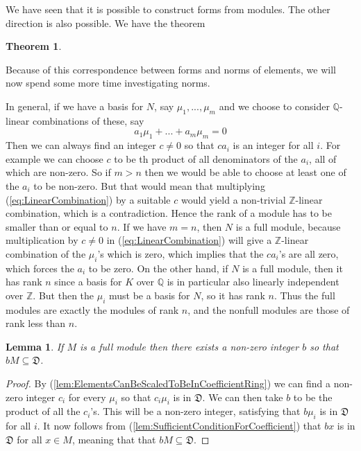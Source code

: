 \documentclass{article}
\newtheorem{theorem}{Theorem}[section]
\newtheorem{lemma}{Lemma}[section]
\newcommand{\mfrak}[1]{\mathfrak{#1}}
\newcommand{\mbb}[1]{\mathbb{#1}}
\begin{document}
We have seen that it is possible to construct forms from modules. The other direction is also possible. We have the theorem

\begin{theorem}
\end{theorem}

Because of this correspondence between forms and norms of elements, we will now spend some more time investigating norms. 

In general, if we have a basis for $N$, say $\mu_1, ..., \mu_m$ and we choose to consider $\mbb Q$-linear combinations of these, say 
\begin{equation} \label{eq:LinearCombination}
    a_1 \mu_1 + ... + a_m \mu_m = 0 
\end{equation}
Then we can always find an integer $c \neq 0$ so that $c a_i$ is an integer for all $i$. For example we can choose $c$ to be th product of all denominators of the $a_i$, all of which are non-zero. So if $m > n$ then we would be able to choose at least one of the $a_i$ to be non-zero. But that would mean that multiplying (\ref{eq:LinearCombination}) by a suitable $c$ would yield a non-trivial $\mbb Z$-linear combination, which is a contradiction. Hence the rank of a module has to be smaller than or equal to $n$. If we have $m = n$, then $N$ is a full module, because multiplication by $c \neq 0$ in (\ref{eq:LinearCombination}) will give a $\mbb Z$-linear combination of the $\mu_i$'s which is zero, which implies that the $ca_i$'s are all zero, which forces the $a_i$ to be zero. On the other hand, if $N$ is a full module, then it has rank $n$ since a basis for $K$ over $\mbb Q$ is in particular also linearly independent over $\mbb Z$. But then the $\mu_i$ must be a basis for $N$, so it has rank $n$. Thus the full modules are exactly the modules of rank $n$, and the nonfull modules are those of rank less than $n$.

\begin{lemma}\label{lem:ModuleCanBeScaledToFitInsideCoefficientRing}
    If $M$ is a full module then there exists a non-zero integer $b$ so that $bM \subseteq \mfrak D$.
    \end{lemma}
    \begin{proof}
    By (\ref{lem:ElementsCanBeScaledToBeInCoefficientRing}) we can find a non-zero integer $c_i$ for every $\mu_i$ so that $c_i \mu_i$ is in $\mfrak D$. We can then take $b$ to be the product of all the $c_i$'s. This will be a non-zero integer, satisfying that $b \mu_i$ is in $\mfrak D$ for all $i$. It now follows from (\ref{lem:SufficientConditionForCoefficient}) that $bx$ is in $\mfrak D$ for all $x \in M$, meaning that 
    that $b M \subseteq \mfrak D$.
\end{proof}
\end{document}
